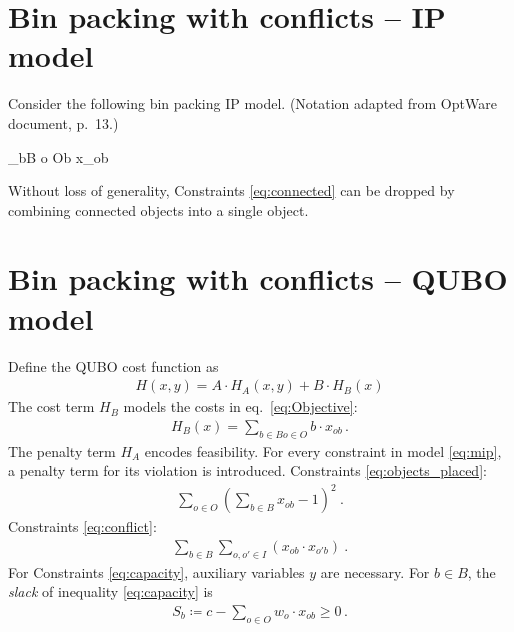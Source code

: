 \section{Bin packing with conflicts -- IP model}
Consider the following bin packing IP model.
(Notation adapted from OptWare document, p.~13.)
\begin{mini!}
	{}{\displaystyle\sum_{b\in B o \in O}b \cdot x_{ob}\label{eq:Objective}}{\label{eq:mip}}{}
\end{mini!}
Without loss of generality, Constraints \eqref{eq:connected} can be dropped by combining connected objects into a single object.
\section{Bin packing with conflicts -- QUBO model}
Define the QUBO cost function as
\begin{align}\label{eq:costfunction}
	H(x,y) = A\cdot H_A(x,y) + B\cdot H_B(x)
\end{align}
The cost term $H_B$ models the costs in eq.~\eqref{eq:Objective}:
\begin{align}
	H_B(x) = \sum_{b\in B o \in O}b\cdot x_{ob}\,.
\end{align}
The penalty term $H_A$ encodes feasibility.
For every constraint in model \eqref{eq:mip}, a penalty term for its violation is introduced.
Constraints \eqref{eq:objects_placed}:
\begin{align}
	\sum_{o\in O}\left(\sum_{b\in B}x_{ob}-1\right)^2\ .
\end{align}
Constraints \eqref{eq:conflict}:
\begin{align}
	\sum_{b\in B}\sum_{o,o'\in I}\left(x_{ob}\cdot x_{o'b}\right)\ .
\end{align}
For Constraints \eqref{eq:capacity}, auxiliary variables $y$ are necessary.
For $b \in B$, the \emph{slack} of inequality \eqref{eq:capacity} is
\begin{align}
	S_b \coloneqq c-\sum_{ o \in O}w_o\cdot x_{ob} \geq 0\,.
\end{align}
